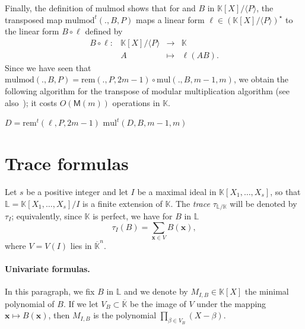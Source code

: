 \documentclass[12pt]{article}
\def\M {\ensuremath{\mathsf{M}}}
\def\K {\ensuremath{\mathbb{K}}}
\def\Kbar {\ensuremath{\overline{\mathbb{K}}}}
\def\L {\ensuremath{\mathbb{L}}}
\def\mul {\ensuremath{\mathrm{mul}}}
\def\rem {\ensuremath{\mathrm{rem}}}
\def\mulmod {\ensuremath{\mathrm{mulmod}}}
\def\x {\ensuremath{\mathbf{x}}}
\begin{document}
Finally, the definition of $\mulmod$ shows that for and $B$ in
$\K[X]/\langle P \rangle$, the transposed map $\mulmod^t(.,B,P)$ maps
a linear form $\ell \in (\K[X]/\langle P \rangle)^\star$ to the linear
form $B \circ \ell$ defined by
$$
\begin{array}{cccc}
B \circ \ell: &\K[X]/\langle P \rangle &\to& \K  \\
& A & \mapsto & \ell(A B).
\end{array}$$
Since we have seen that $\mulmod(.,B,P) = \rem(.,P,2m-1) \circ \mul(.,B,m-1,m)$,
we obtain the following algorithm for the transpose of modular multiplication
algorithm (see also~\cite{shoup99,bostan+lecerf+schost:tellegen});
it costs $O(\M(m))$ operations in $\K$.


\begin{algorithm}[H]
  \caption{$\mulmod^t(\ell,B,P)$}
  \begin{algorithmic}[1]
    \STATE $D = \rem^t(\ell,P,2m-1)$
    \RETURN $\mul^t(D, B, m-1, m)$
  \end{algorithmic}
\end{algorithm}


\section{Trace formulas} 

Let $s$ be a positive integer and let $I$ be a maximal ideal in
$\K[X_1,\dots,X_s]$, so that $\L=\K[X_1,\dots,X_s]/I$ is a finite
extension of $\K$.  The {\em trace} $\tau_{\L/\K}$ will be denoted by
$\tau_I$; equivalently, since $\K$ is perfect, we have for $B$ in $\L$
\begin{equation}\label{eq:tr}
\tau_{I}(B)=\sum_{\x \in V} B(\x),
\end{equation}
where $V=V(I)$ lies in $\Kbar^n$. 

\paragraph{Univariate formulas.} In this paragraph, we fix $B$ in $\L$ and we 
denote by $M_{I,B} \in \K[X]$ the minimal polynomial of $B$. If we let
$V_B \subset \Kbar$ be the image of $V$ under the mapping $\x \mapsto
B(\x)$, then $M_{I,B}$ is the polynomial $\prod_{\beta \in
  V_B}(X-\beta)$.
\end{document}
